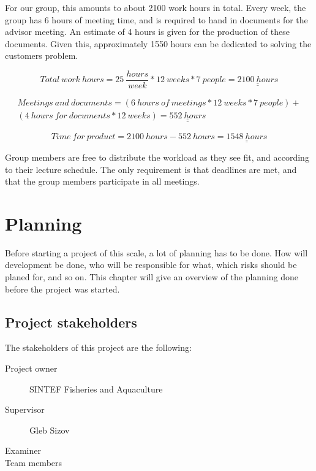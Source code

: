 \documentclass[11pt,a4paper,titlepage,oneside]{report}
\begin{document}
For our group, this amounts to about 2100 work hours in total. Every week, the group has 6 hours of meeting time, and is required to hand in documents for the advisor meeting. An estimate of 4 hours is given for the production of these documents. Given this, approximately 1550 hours can be dedicated to solving the customers problem.

\begin{equation}
Total\:work\:hours = 25\:\frac{hours}{week} * 12\:weeks * 7\:people = \underline{\underline{2100\:hours}} \nonumber
\end{equation}

\begin{equation}
\begin{split}
Meetings\:and\:documents = (6\:hours\:of\:meetings * 12\:weeks * 7\:people) + \\ 
(4\:hours\:for\:documents * 12\:weeks) = \underline{\underline{552\:hours}} \nonumber
\end{split}
\end{equation}

\begin{equation}
Time\:for\:product = 2100\:hours - 552\:hours = \underline{\underline{1548\:hours}} \nonumber
\end{equation}

Group members are free to distribute the workload as they see fit, and according to their lecture schedule. The only requirement is that deadlines are met, and that the group members participate in all meetings. 

\chapter{Planning}
Before starting a project of this scale, a lot of planning has to be done. How will development be done, who will be responsible for what, which risks should be planed for, and so on. This chapter will give an overview of the planning done before the project was started. 

\section{Project stakeholders}
The stakeholders of this project are the following:
\begin{description}
\item[Project owner] SINTEF Fisheries and Aquaculture
\item[Supervisor] Gleb Sizov
\item[Examiner] 
\item[Team members] 
\end{description}
\end{document}
